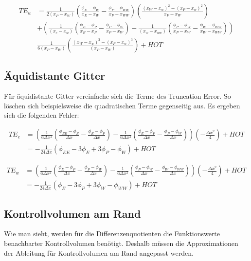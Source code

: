 \documentclass[11pt, ngerman,colorback,accentcolor=tud2d]{tudreport}
\begin{document}
\begin{align*}
  TE_w &= \frac{1}{2 (x_P-x_W)} \left({
\frac{\phi_{E}-\phi_W}{x_{E}-x_W}-\frac{\phi_P-\phi_{WW}}{x_P-x_{WW}}}\right)
  \left({\frac{{(x_W-x_w)}^2-{(x_P-x_w)}^2}{x_P-x_W}}\right)\\
&+
\left({
\frac{1}{(x_e-x_w)}
\left({\frac{\phi_E-\phi_P}{x_E-x_P}-\frac{\phi_P-\phi_W}{x_P-x_W} }\right)
-\frac{1}{(x_w-x_{ww})}
\left({\frac{\phi_P-\phi_W}{x_P-x_W} - \frac{\phi_W-\phi_{WW}}{x_W-x_{WW}}  }\right)
}\right)\\
&\frac{1}{6(x_P-x_W)}\left({\frac{{(x_W-x_w)}^3-{(x_P-x_w)}^3}{(x_P-x_W)}}\right)
  +HOT
\end{align*}

\subsection{Äquidistante Gitter}

Für äquidistante Gitter vereinfache sich die Terme des Truncation Error. So löschen
sich beispielsweise die quadratischen Terme gegenseitig aus. Es ergeben sich die
folgenden Fehler:

\begin{align*}
  {TE}_e &= \left({
\frac{1}{6\Delta x^2}
\left({\frac{\phi_{EE}-\phi_E}{\Delta x}-\frac{\phi_E-\phi_P}{\Delta x} }\right)
-\frac{1}{6\Delta x^2}
\left({\frac{\phi_E-\phi_P}{\Delta x} - \frac{\phi_P-\phi_W}{\Delta x}  }\right)
}\right)\left({-\frac{\Delta x^2}{4} }\right)+HOT\\
&= -\frac{1}{24\Delta x}\left({
\phi_{EE}-3\phi_E+3\phi_P-\phi_W}\right)+HOT
\end{align*}

\begin{align*}
  TE_w &=\left({
\frac{1}{6 \Delta x^2}
\left({\frac{\phi_E-\phi_P}{\Delta x}-\frac{\phi_P-\phi_W}{\Delta x} }\right)
-\frac{1}{6\Delta x^2}
\left({\frac{\phi_P-\phi_W}{\Delta x} - \frac{\phi_W-\phi_{WW}}{\Delta x}  }\right)
}\right)
\left({-\frac{\Delta x^2}{4} }\right)+HOT\\
&= -\frac{1}{24 \Delta x}\left({
\phi_E-3\phi_P+3\phi_W-\phi_{WW}}\right)+HOT
\end{align*}


\subsection{Kontrollvolumen am Rand}


Wie man sieht, werden für die Differenzenquotienten die Funktionswerte benachbarter
Kontrollvolumen benötigt. Deshalb müssen die Approximationen der Ableitung für
Kontrollvolumen am Rand angepasst werden.
\end{document}

